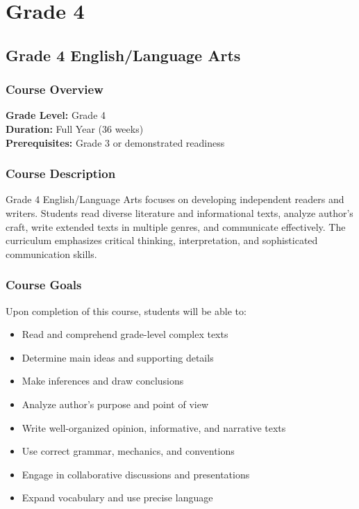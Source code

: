 \documentclass[11pt,letterpaper]{report}
\begin{document}
\part{Grade 4}

\chapter{Grade 4 English/Language Arts}

\section{Course Overview}

\textbf{Grade Level:} Grade 4\\
\textbf{Duration:} Full Year (36 weeks)\\
\textbf{Prerequisites:} Grade 3 or demonstrated readiness

\section{Course Description}

Grade 4 English/Language Arts focuses on developing independent readers and writers. Students read diverse literature and informational texts, analyze author's craft, write extended texts in multiple genres, and communicate effectively. The curriculum emphasizes critical thinking, interpretation, and sophisticated communication skills.

\section{Course Goals}

Upon completion of this course, students will be able to:

\begin{itemize}
    \item Read and comprehend grade-level complex texts
    \item Determine main ideas and supporting details
    \item Make inferences and draw conclusions
    \item Analyze author's purpose and point of view
    \item Write well-organized opinion, informative, and narrative texts
    \item Use correct grammar, mechanics, and conventions
    \item Engage in collaborative discussions and presentations
    \item Expand vocabulary and use precise language
\end{itemize}
\end{document}
